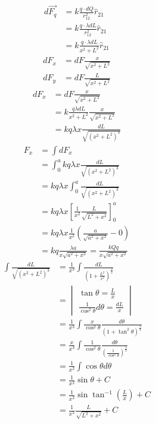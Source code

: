 \documentclass{article}
\begin{document}
\begin{align}
  d\vec{F_q} & =k\frac{q \cdot dQ}{r_{12}^2}\hat{r}_{21}         \\
             & =k\frac{q \cdot \lambda dL}{r_{12}^2}\hat{r}_{21} \\
             & =k\frac{q\cdot \lambda dL}{x^2+L^2}\hat{r}_{21}
\end{align}
\begin{align}
  dF_x & = dF\frac{x}{\sqrt{x^2+L^2}} \\
  dF_y & = dF\frac{L}{\sqrt{x^2+L^2}}
\end{align}
\begin{align}
  dF_x & = dF\frac{x}{\sqrt{x^2+L^2}}                            \\
       & = k\frac{q \lambda dL}{x^2+L^2}\frac{x}{\sqrt{x^2+L^2}} \\
       & = kq{\lambda}x\frac{dL}{\sqrt{(x^2+L^2)^3}}
\end{align}
\begin{align}
  F_x & = \int dF_x                                                          \\
      & = \int_{0}^{a} kq{\lambda}x\frac{dL}{\sqrt{(x^2+L^2)^3}}             \\
      & = kq{\lambda}x\int_{0}^{a}\frac{dL}{\sqrt{(x^2+L^2)^3}}              \\
      & = kq{\lambda}x\left[\frac{1}{x^2}\frac{L}{\sqrt{L^2+x^2}}\right]_0^a \\
      & = kq{\lambda}x\frac{1}{x^2}\left(\frac{a}{\sqrt{a^2+x^2}} - 0\right) \\
      & = kq\frac{{\lambda}a}{x\sqrt{a^2+x^2}} = \frac{kQq}{x\sqrt{a^2+x^2}}
\end{align}
\begin{align}
  \int\frac{dL}{\sqrt{(x^2+L^2)^3}}
   & = \frac{1}{x^3}\int\frac{dL}{\left(1+\frac{L^2}{x^2}\right)^\frac{3}{2}}                                 \\
   & = \begin{vmatrix}
         \tan\theta = \frac{L}{x} \\
         \frac{1}{\cos^2\theta}d\theta = \frac{dL}{x}
       \end{vmatrix}                                                            \\
   & = \frac{1}{x^3}\int\frac{x}{\cos^2\theta}\frac{d\theta}{\left(1+\tan^2\theta\right)^{\frac{3}{2}}}       \\
   & = \frac{x}{x^3}\int\frac{1}{\cos^2\theta}\frac{d\theta}{\left(\frac{1}{\cos^2\theta}\right)^\frac{3}{2}} \\
   & = \frac{1}{x^2}\int\cos\theta{d}\theta                                                                   \\
   & = \frac{1}{x^2}\sin\theta + C                                                                            \\
   & = \frac{1}{x^2}\sin\tan^{-1}\left(\frac{L}{x}\right) + C                                                 \\
   & = \frac{1}{x^2}\frac{L}{\sqrt{L^2+x^2}} + C
\end{align}
\end{document}
